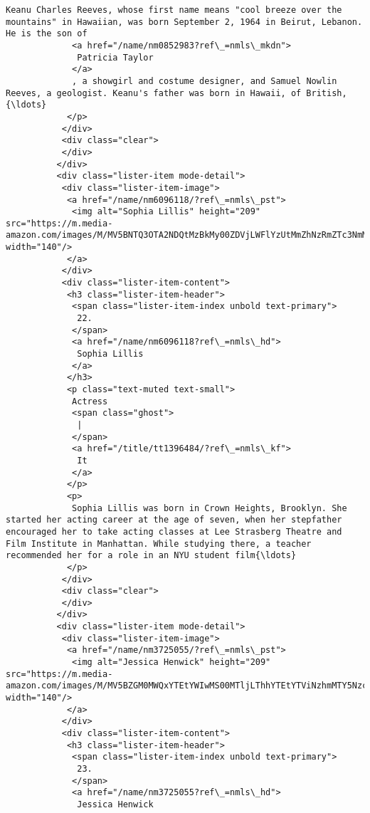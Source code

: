 \documentclass[11pt]{article}
\begin{document}
\begin{Verbatim}[commandchars=\\\{\}]
             Keanu Charles Reeves, whose first name means "cool breeze over the mountains" in Hawaiian, was born September 2, 1964 in Beirut, Lebanon. He is the son of
             <a href="/name/nm0852983?ref\_=nmls\_mkdn">
              Patricia Taylor
             </a>
             , a showgirl and costume designer, and Samuel Nowlin Reeves, a geologist. Keanu's father was born in Hawaii, of British, {\ldots}
            </p>
           </div>
           <div class="clear">
           </div>
          </div>
          <div class="lister-item mode-detail">
           <div class="lister-item-image">
            <a href="/name/nm6096118/?ref\_=nmls\_pst">
             <img alt="Sophia Lillis" height="209" src="https://m.media-amazon.com/images/M/MV5BNTQ3OTA2NDQtMzBkMy00ZDVjLWFlYzUtMmZhNzRmZTc3NmM1XkEyXkFqcGdeQXVyNjc1NTc4MDA@.\_V1\_UX140\_CR0,0,140,209\_AL\_.jpg" width="140"/>
            </a>
           </div>
           <div class="lister-item-content">
            <h3 class="lister-item-header">
             <span class="lister-item-index unbold text-primary">
              22.
             </span>
             <a href="/name/nm6096118?ref\_=nmls\_hd">
              Sophia Lillis
             </a>
            </h3>
            <p class="text-muted text-small">
             Actress
             <span class="ghost">
              |
             </span>
             <a href="/title/tt1396484/?ref\_=nmls\_kf">
              It
             </a>
            </p>
            <p>
             Sophia Lillis was born in Crown Heights, Brooklyn. She started her acting career at the age of seven, when her stepfather encouraged her to take acting classes at Lee Strasberg Theatre and Film Institute in Manhattan. While studying there, a teacher recommended her for a role in an NYU student film{\ldots}
            </p>
           </div>
           <div class="clear">
           </div>
          </div>
          <div class="lister-item mode-detail">
           <div class="lister-item-image">
            <a href="/name/nm3725055/?ref\_=nmls\_pst">
             <img alt="Jessica Henwick" height="209" src="https://m.media-amazon.com/images/M/MV5BZGM0MWQxYTEtYWIwMS00MTljLThhYTEtYTViNzhmMTY5Nzc1XkEyXkFqcGdeQXVyMTAwODk1MDk@.\_V1\_UX140\_CR0,0,140,209\_AL\_.jpg" width="140"/>
            </a>
           </div>
           <div class="lister-item-content">
            <h3 class="lister-item-header">
             <span class="lister-item-index unbold text-primary">
              23.
             </span>
             <a href="/name/nm3725055?ref\_=nmls\_hd">
              Jessica Henwick

\end{Verbatim}
\end{document}

